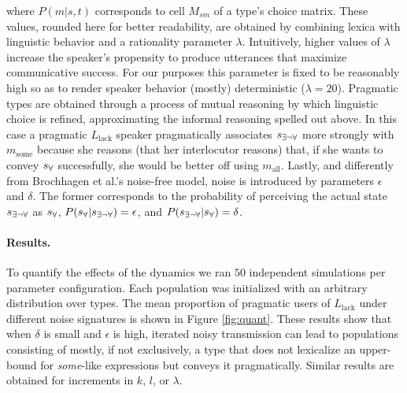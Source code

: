 \documentclass[10pt,a4paper]{article}
\newcommand{\state}{\ensuremath{s}\xspace}		%
\newcommand{\mystate}[1]{\ensuremath{\state_{\text{#1}}}\xspace} %
\newcommand{\messg}{\ensuremath{m}\xspace}		%
\newcommand{\mymessg}[1]{\ensuremath{\messg_{\text{#1}}}\xspace} %
\newcommand{\ssome}{\mystate{\ensuremath{\exists\neg\forall}}}
\newcommand{\sall}{\mystate{\ensuremath{\forall}}}
\newcommand{\msome}{\mymessg{some}}
\newcommand{\mall}{\mymessg{all}}
\begin{document}
where $P(m|s,t)$ corresponds to cell $M_{sm}$ of a type's choice matrix. These values, rounded here for better readability, are obtained by combining lexica with linguistic behavior and a rationality parameter $\lambda$. Intuitively, higher values of $\lambda$ increase the speaker's propensity to produce utterances that maximize communicative success. For our purposes this parameter is fixed to be reasonably high so as to render speaker behavior (mostly) deterministic ($\lambda = 20$). Pragmatic types are obtained through a process of mutual reasoning by which linguistic choice is refined, approximating the informal reasoning spelled out above. In this case a pragmatic $L_{\text{lack}}$ speaker pragmatically associates $\ssome$ more strongly with $\msome$ because she reasons (that her interlocutor reasons) that, if she wants to convey $\sall$ successfully, she would be better off using $\mall$. Lastly, and differently from Brochhagen et al.'s noise-free model, noise is introduced by parameters $\epsilon$ and $\delta$. The former corresponds to the probability of perceiving the actual state $\ssome$ as $\sall$, $P(\sall | \ssome) = \epsilon$, and $P(\ssome | \sall) = \delta$.

\paragraph{Results.} To quantify the effects of the dynamics we ran $50$ independent
simulations per parameter configuration. Each population was initialized with an arbitrary
distribution over types. The mean proportion of pragmatic users of $L_{\text{lack}}$ under
different noise signatures is shown in Figure \ref{fig:quant}. These results show that when
$\delta$ is small and $\epsilon$ is high, iterated noisy transmission can lead to populations
consisting of mostly, if not exclusively, a type that does not lexicalize an upper-bound for {\em some}-like expressions but conveys it pragmatically.  Similar results are obtained for
increments in $k$, $l$, or $\lambda$.
\end{document}
